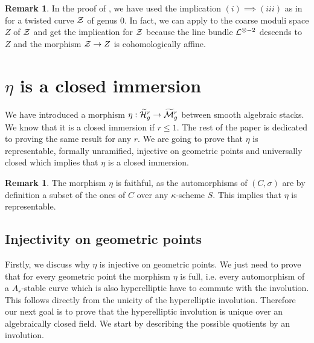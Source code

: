 \documentclass{alggeom}
\numberwithin{equation}{section}
\numberwithin{subsection}{section}
\theoremstyle{definition}
\newtheorem{remark}[theorem]{Remark}
\theoremstyle{remark}
\newcommand\arr{\ifinner\to\else\longrightarrow\fi}
\newcommand{\Mtilde}{\widetilde{\mathcal M}}
\newcommand{\Htilde}{\widetilde{\cH}}
\begin{document}
\begin{remark}
	In the proof of , we have used the implication $(i) \implies (iii)$ as in   for a twisted curve $\mathcal{Z}$ of genus $0$. In fact, we can apply  to the coarse moduli space $Z$ of $\mathcal{Z}$ and get the implication for $\mathcal{Z}$ because the line bundle  $\mathcal{L}^{\otimes -2}$ descends to $Z$ and the morphism $\mathcal{Z}\rightarrow Z$ is cohomologically affine.
\end{remark}

\section{$\eta$ is a closed immersion}\label{sec:3}


We have introduced a morphism $\eta:\Htilde_g^r \arr \Mtilde_g^r$ between smooth algebraic stacks. We know that it is a closed immersion if $r\leq 1$. The rest of the paper is dedicated to proving the same result for any $r$. We are going to prove that $\eta$ is representable, formally unramified, injective on geometric points and universally closed which implies that $\eta$ is a closed immersion.

\begin{remark}
The morphism $\eta$ is faithful, as the automorphisms of $(C,\sigma)$ are by definition a subset of the ones of $C$ over any $\kappa$-scheme $S$. This implies that $\eta$ is representable.
\end{remark}





\subsection*{Injectivity on geometric points}
Firstly, we discuss why $\eta$ is injective on geometric points. We just need to prove that for every geometric point the morphism $\eta$ is full, i.e. every automorphism of a $A_r$-stable curve which is also hyperelliptic have to commute with the involution. This follows directly from the unicity of the hyperelliptic involution. Therefore our next goal is to prove that the hyperelliptic involution is unique over an algebraically closed field. We start by describing the possible quotients by an involution.
\end{document}
